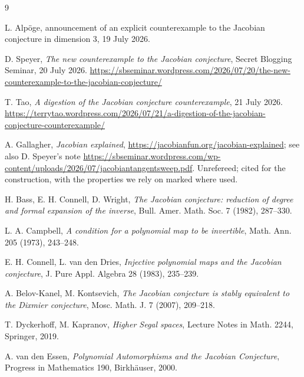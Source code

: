 \documentclass[11pt]{article}
\theoremstyle{change}
\theoremstyle{nonumberplain}
\begin{document}
\begin{thebibliography}{9}

 L. Alp\"oge, announcement of an explicit counterexample to the Jacobian conjecture in dimension $3$, 19 July 2026.

 D. Speyer, \emph{The new counterexample to the Jacobian conjecture}, Secret Blogging Seminar, 20 July 2026. \url{https://sbseminar.wordpress.com/2026/07/20/the-new-counterexample-to-the-jacobian-conjecture/}

 T. Tao, \emph{A digestion of the Jacobian conjecture counterexample}, 21 July 2026. \url{https://terrytao.wordpress.com/2026/07/21/a-digestion-of-the-jacobian-conjecture-counterexample/}

 A. Gallagher, \emph{Jacobian explained}, \url{https://jacobianfun.org/jacobian-explained}; see also D. Speyer's note \url{https://sbseminar.wordpress.com/wp-content/uploads/2026/07/jacobiantangentsweep.pdf}. Unrefereed; cited for the construction, with the properties we rely on marked where used.

 H. Bass, E. H. Connell, D. Wright, \emph{The Jacobian conjecture: reduction of degree and formal expansion of the inverse}, Bull. Amer. Math. Soc. 7 (1982), 287--330.

 L. A. Campbell, \emph{A condition for a polynomial map to be invertible}, Math. Ann. 205 (1973), 243--248.

 E. H. Connell, L. van den Dries, \emph{Injective polynomial maps and the Jacobian conjecture}, J. Pure Appl. Algebra 28 (1983), 235--239.

 A. Belov-Kanel, M. Kontsevich, \emph{The Jacobian conjecture is stably equivalent to the Dixmier conjecture}, Mosc. Math. J. 7 (2007), 209--218.

 T. Dyckerhoff, M. Kapranov, \emph{Higher Segal spaces}, Lecture Notes in Math. 2244, Springer, 2019.

 A. van den Essen, \emph{Polynomial Automorphisms and the Jacobian Conjecture}, Progress in Mathematics 190, Birkh\"auser, 2000.

\end{thebibliography}
\end{document}
